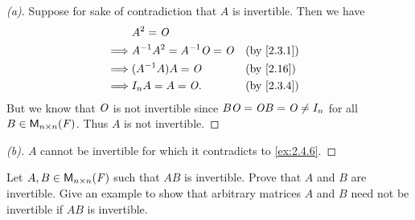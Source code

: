 \begin{proof}[(a)]
  Suppose for sake of contradiction that \(A\) is invertible.
  Then we have
  \begin{align*}
             & A^2 = \zm                                                   \\
    \implies & A^{-1} A^2 = A^{-1} \zm = \zm &  & \text{(by \cref{2.3.1})} \\
    \implies & (A^{-1} A) A = \zm            &  & \text{(by \cref{2.16})}  \\
    \implies & I_n A = A = \zm.              &  & \text{(by \cref{2.3.4})}
  \end{align*}
  But we know that \(\mathit{O}\) is not invertible since \(B \mathit{O} = \mathit{O} B = \mathit{O} \neq I_n\) for all \(B \in \mathsf{M}_{{n} \times n}({\mathit{F}})\).
  Thus \(A\) is not invertible.
\end{proof}

\begin{proof}[(b)]
  \(A\) cannot be invertible for which it contradicts to \cref{ex:2.4.6}.
\end{proof}

\setcounter{ex}{8}
\begin{ex}\label{ex:2.4.9}
  Let \(A, B \in \mathsf{M}_{{n} \times n}({\mathit{F}})\) such that \(AB\) is invertible.
  Prove that \(A\) and \(B\) are invertible.
  Give an example to show that arbitrary matrices \(A\) and \(B\) need not be invertible if \(AB\) is invertible.
\end{ex}

